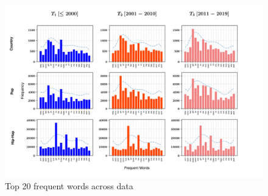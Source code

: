 \documentclass[11pt,a4paper]{article}
\begin{document}
\begin{figure}
\includegraphics[width=\textwidth]{freqbarExtend}
\caption{Top 20 frequent words across data}
\label{fig:freqbarExtend}
\end{figure}
\end{document}
